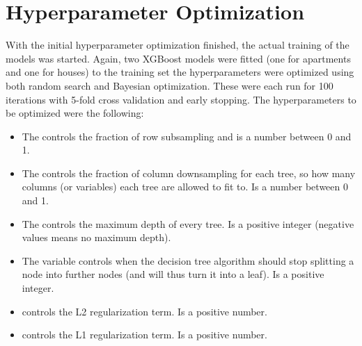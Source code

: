 \FloatBarrier
\section{Hyperparameter Optimization}
\label{sec:h:hyperparamater_optimization}
With the initial hyperparameter optimization finished, the actual training of the models was started. Again, two XGBoost models were fitted (one for apartments and one for houses) to the training set the hyperparameters were optimized using both random search and Bayesian optimization. These were each run for \num{100} iterations with \num{5}-fold cross validation and early stopping. The hyperparameters to be optimized were the following:
\begin{itemize}
  \item[] The  controls the fraction of row subsampling and is a number between \num{0} and \num{1}. 
  \item[] The  controls the fraction of column downsampling for each tree, so how many columns (or variables) each tree are allowed to fit to. Is a number between \num{0} and \num{1}.
  \item[] The  controls the maximum depth of every tree. Is a positive integer (negative values means no maximum depth).  
  \item[] The  variable controls when the decision tree algorithm should stop splitting a node into further nodes (and will thus turn it into a leaf). Is a positive integer.
  \item[]  controls the L2 regularization term. Is a positive number. 
  \item[]  controls the L1 regularization term. Is a positive number.
\end{itemize}

